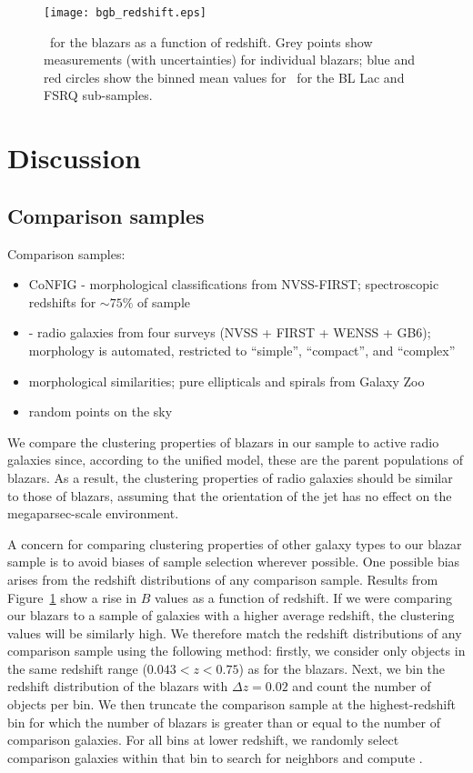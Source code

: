 \documentclass{emulateapj}
\begin{document}
\begin{figure}
\texttt{[image: bgb\_redshift.eps]}
\caption{\bgb~for the blazars as a function of redshift. Grey points show measurements (with uncertainties) for individual blazars; blue and red circles show the binned mean values for \bgb~for the BL Lac and FSRQ sub-samples. 
\label{fig-bgb_redshift}}
\end{figure}


\section{Discussion}\label{sec-survey_discussion}

\subsection{Comparison samples}\label{ssec-comparison}

Comparison samples:

\begin{itemize}
	\item CoNFIG \citep{gen08} - morphological classifications from NVSS-FIRST; spectroscopic redshifts for $\sim75\%$ of sample
	\item \citet{kim08} - radio galaxies from four surveys (NVSS + FIRST + WENSS + GB6); morphology is automated, restricted to ``simple'', ``compact'', and ``complex''
	\item morphological similarities; pure ellipticals and spirals from Galaxy Zoo
	\item random points on the sky 
\end{itemize}

We compare the clustering properties of blazars in our sample to active radio galaxies since, according to the unified model, these are the parent populations of blazars. As a result, the clustering properties of radio galaxies should be similar to those of blazars, assuming that the orientation of the jet has no effect on the megaparsec-scale environment. 

A concern for comparing clustering properties of other galaxy types to our blazar sample is to avoid biases of sample selection wherever possible. One possible bias arises from the redshift distributions of any comparison sample. Results from Figure~\ref{fig-bgb_redshift} show a rise in $B$ values as a function of redshift. If we were comparing our blazars to a sample of galaxies with a higher average redshift, the clustering values will be similarly high. We therefore match the redshift distributions of any comparison sample using the following method: firstly, we consider only objects in the same redshift range ($0.043<z<0.75$) as for the blazars. Next, we bin the redshift distribution of the blazars with $\Delta z=0.02$ and count the number of objects per bin. We then truncate the comparison sample at the highest-redshift bin for which the number of blazars is greater than or equal to the number of comparison galaxies. For all bins at lower redshift, we randomly select comparison galaxies within that bin to search for neighbors and compute \bgb. 
\end{document}
